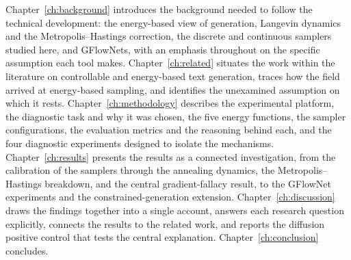 Chapter~\ref{ch:background} introduces the background needed to follow the technical development: the energy-based view of generation, Langevin dynamics and the Metropolis--Hastings correction, the discrete and continuous samplers studied here, and GFlowNets, with an emphasis throughout on the specific assumption each tool makes. Chapter~\ref{ch:related} situates the work within the literature on controllable and energy-based text generation, traces how the field arrived at energy-based sampling, and identifies the unexamined assumption on which it rests. Chapter~\ref{ch:methodology} describes the experimental platform, the diagnostic task and why it was chosen, the five energy functions, the sampler configurations, the evaluation metrics and the reasoning behind each, and the four diagnostic experiments designed to isolate the mechanisms. Chapter~\ref{ch:results} presents the results as a connected investigation, from the calibration of the samplers through the annealing dynamics, the Metropolis--Hastings breakdown, and the central gradient-fallacy result, to the GFlowNet experiments and the constrained-generation extension. Chapter~\ref{ch:discussion} draws the findings together into a single account, answers each research question explicitly, connects the results to the related work, and reports the diffusion positive control that tests the central explanation. Chapter~\ref{ch:conclusion} concludes.
